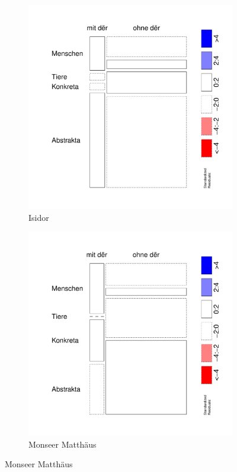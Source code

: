 
\begin{figure}
\begin{subfigure}[b]{.5\linewidth}
  \includegraphics[height=.25\textheight]{generated/images/bel-hapaxe-residuals-I}
\caption {Isidor}
\end{subfigure}%
\begin{subfigure}[b]{.5\linewidth}
  \includegraphics[height=.25\textheight]{generated/images/bel-hapaxe-residuals-M}
\caption {Monseer Matthäus}
\end{subfigure}


\end{figure}
